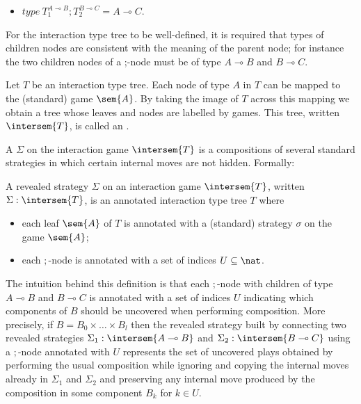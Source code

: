 \begin{definition}
\begin{itemize}
\begin{itemize}
    \item $type\ T_1^{A \multimap B};T_2^{B \multimap C} = A \multimap C$.
    \end{itemize}

\end{itemize}

For the interaction type tree to be well-defined, it is required
that types of children nodes are consistent with the meaning of the
parent node; for instance the two children nodes of a ;-node must be
of type $A\multimap B$ and $B\multimap C$.

\end{definition}


Let $T$ be an interaction type tree. Each node of type $A$ in $T$
can be mapped to the (standard) game $\sem{A}$. By taking the image
of $T$ across this mapping we obtain a tree whose leaves and nodes
are labelled by games. This tree, written $\intersem{T}$, is called
an .

A  $\Sigma$ on the interaction game $\intersem{T}$ is a compositions of several standard strategies in which certain internal moves are not hidden. Formally:
\begin{definition}
A revealed strategy $\Sigma$ on an interaction game $\intersem{T}$,
written $\Sigma: \intersem{T}$, is an annotated interaction type
tree $T$ where
\begin{itemize}
\item each leaf $\sem{A}$ of $T$ is annotated with a (standard) strategy $\sigma$ on the game
$\sem{A}$;
\item each $;$-node is annotated with a set of indices $U \subseteq \nat$.
\end{itemize}
\end{definition}

The intuition behind this definition is that each $;$-node with children of type $A\multimap B$ and $B\multimap C$ is annotated with a set of indices $U$ indicating which components of $B$ should be uncovered when performing composition.
More precisely, if $B = B_0 \times \ldots \times B_l$ then the revealed strategy built by connecting two revealed strategies $\Sigma_1 : \intersem{A\multimap B}$ and $\Sigma_2 : \intersem{B\multimap C}$
using a $;$-node annotated with $U$ represents the
set of uncovered plays obtained
by performing the usual composition while ignoring and copying the internal moves already in $\Sigma_1$ and $\Sigma_2$ and preserving any internal
move produced by the composition in some component $B_k$ for $k \in U$.

